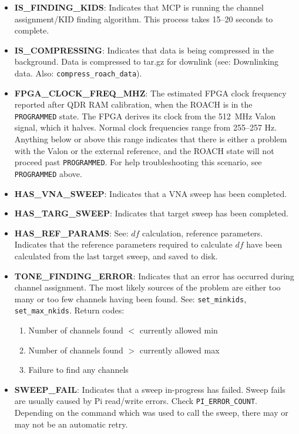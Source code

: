 \begin{itemize}[leftmargin=*,label={}]
\item \textbf{IS\_FINDING\_KIDS}: Indicates that MCP is running the channel assignment/KID finding algorithm. This process takes 15--20 seconds to complete.

\item \textbf{IS\_COMPRESSING}: Indicates that data is being compressed in the background. Data is compressed to tar.gz for downlink (see: Downlinking data. Also: \texttt{compress\_roach\_data}).

\item \textbf{FPGA\_CLOCK\_FREQ\_MHZ}: The estimated FPGA clock frequency reported after QDR RAM calibration, when the ROACH is in the \texttt{PROGRAMMED} state. The FPGA derives its clock from the 512~MHz Valon signal, which it halves. Normal clock frequencies range from 255--257 Hz. Anything below or above this range indicates that there is either a problem with the Valon or the external reference, and the ROACH state will not proceed past \texttt{PROGRAMMED}. For help troubleshooting this scenario, see \texttt{PROGRAMMED} above.

\item \textbf{HAS\_VNA\_SWEEP}: Indicates that a VNA sweep has been completed.

\item \textbf{HAS\_TARG\_SWEEP}: Indicates that target sweep has been completed.

\item \textbf{HAS\_REF\_PARAMS}: See: $df$ calculation, reference parameters. Indicates that the reference parameters required to calculate $df$ have been calculated from the last target sweep, and saved to disk.

\item \textbf{TONE\_FINDING\_ERROR}: Indicates that an error has occurred during channel assignment. The most likely sources of the problem are either too many or too few channels having been found. See: \texttt{set\_minkids}, \texttt{set\_max\_nkids}.
Return codes:
\begin{enumerate}
  \item Number of channels found $<$ currently allowed min
  \item Number of channels found $>$ currently allowed max
  \item Failure to find any channels
\end{enumerate}

\item \textbf{SWEEP\_FAIL}: Indicates that a sweep in-progress has failed. Sweep fails are usually caused by Pi read/write errors. Check \texttt{PI\_ERROR\_COUNT}. Depending on the command which was used to call the sweep, there may or may not be an automatic retry.


\end{itemize}
